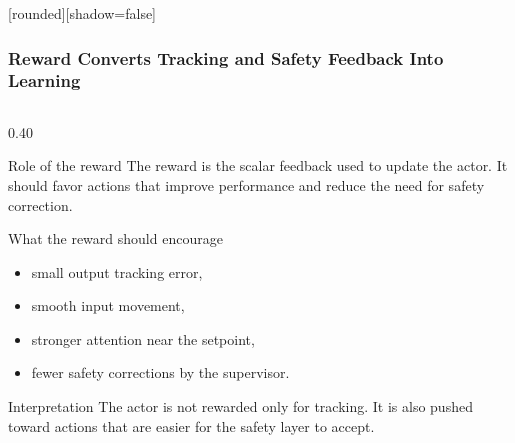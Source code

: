 \documentclass[aspectratio=169]{beamer}
\begin{document}
\begin{frame}
[rounded][shadow=false]
\frametitle{\large \textbf{Reward Converts Tracking and Safety Feedback Into Learning}}
\scriptsize

\vspace{-0.12cm}
\begin{columns}[T,onlytextwidth]

\begin{column}{0.40\textwidth}
\begin{block}{Role of the reward}
\justifying
The reward is the scalar feedback used to update the actor. It should favor actions that improve performance and reduce the need for safety correction.
\end{block}

\vspace{0.04cm}
\begin{block}{What the reward should encourage}
\begin{itemize}\raggedright
  \setlength\itemsep{0.35ex}
  \item small output tracking error,
  \item smooth input movement,
  \item stronger attention near the setpoint,
  \item fewer safety corrections by the supervisor.
\end{itemize}
\end{block}

\vspace{0.04cm}
\begin{block}{Interpretation}
\justifying
The actor is not rewarded only for tracking. It is also pushed toward actions that are easier for the safety layer to accept.
\end{block}
\end{column}


\end{columns}
\end{frame}
\end{document}
